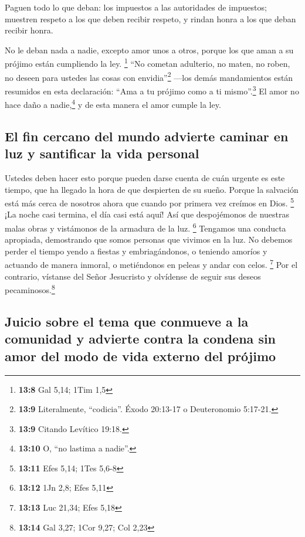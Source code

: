  Paguen todo lo que deban: los impuestos a las autoridades
de impuestos; muestren respeto a los que deben recibir respeto, y rindan
honra a los que deban recibir honra.

 No le deban nada a nadie, excepto amor unos a otros,
porque los que aman a su prójimo están cumpliendo la ley. \footnote{\textbf{13:8}
  Gal 5,14; 1Tim 1,5}  ``No cometan adulterio, no maten,
no roben, no deseen para ustedes las cosas con envidia''\footnote{\textbf{13:9}
  Literalmente, ``codicia''. Éxodo 20:13-17 o Deuteronomio 5:17-21.}
---los demás mandamientos están resumidos en esta declaración: ``Ama a
tu prójimo como a ti mismo''.\footnote{\textbf{13:9} Citando Levítico
  19:18.}  El amor no hace daño a nadie,\footnote{\textbf{13:10}
  O, ``no lastima a nadie''.} y de esta manera el amor cumple la ley.

\hypertarget{el-fin-cercano-del-mundo-advierte-caminar-en-luz-y-santificar-la-vida-personal}{%
\subsection{El fin cercano del mundo advierte caminar en luz y
santificar la vida
personal}\label{el-fin-cercano-del-mundo-advierte-caminar-en-luz-y-santificar-la-vida-personal}}

 Ustedes deben hacer esto porque pueden darse cuenta de
cuán urgente es este tiempo, que ha llegado la hora de que despierten de
su sueño. Porque la salvación está más cerca de nosotros ahora que
cuando por primera vez creímos en Dios. \footnote{\textbf{13:11} Efes
  5,14; 1Tes 5,6-8}  ¡La noche casi termina, el día casi
está aquí! Así que despojémonos de nuestras malas obras y vistámonos de
la armadura de la luz. \footnote{\textbf{13:12} 1Jn 2,8; Efes 5,11}
 Tengamos una conducta apropiada, demostrando que somos
personas que vivimos en la luz. No debemos perder el tiempo yendo a
fiestas y embriagándonos, o teniendo amoríos y actuando de manera
inmoral, o metiéndonos en peleas y andar con celos. \footnote{\textbf{13:13}
  Luc 21,34; Efes 5,18}  Por el contrario, vístanse del
Señor Jesucristo y olvídense de seguir sus deseos
pecaminosos.\footnote{\textbf{13:14} Gal 3,27; 1Cor 9,27; Col 2,23}

\hypertarget{juicio-sobre-el-tema-que-conmueve-a-la-comunidad-y-advierte-contra-la-condena-sin-amor-del-modo-de-vida-externo-del-pruxf3jimo}{%
\subsection{Juicio sobre el tema que conmueve a la comunidad y advierte
contra la condena sin amor del modo de vida externo del
prójimo}\label{juicio-sobre-el-tema-que-conmueve-a-la-comunidad-y-advierte-contra-la-condena-sin-amor-del-modo-de-vida-externo-del-pruxf3jimo}}

